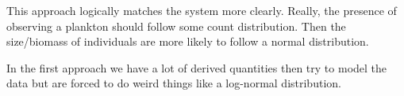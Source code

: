 \documentclass[
  letterpaper,
  DIV=11,
  numbers=noendperiod]{scrartcl}
\begin{document}
This approach logically matches the system more clearly. Really, the
presence of observing a plankton should follow some count distribution.
Then the size/biomass of individuals are more likely to follow a normal
distribution.

In the first approach we have a lot of derived quantities then try to
model the data but are forced to do weird things like a log-normal
distribution.
\end{document}

